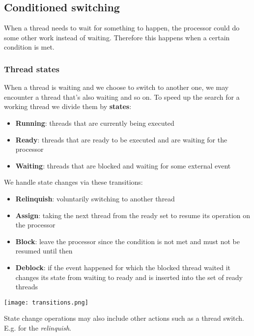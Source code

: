 \subsection{Conditioned switching}
When a thread needs to wait for something to happen, the processor could do some other work instead of waiting. Therefore this happens when a certain condition is met.

\subsubsection{Thread states}
When a thread is waiting and we choose to switch to another one, we may encounter a thread that's also waiting and so on. To speed up the search for a working thread we divide them by \textbf{states}:
\begin{itemize}
	\item \textbf{Running}: threads that are currently being executed
	\item \textbf{Ready}: threads that are ready to be executed and are waiting for the processor
	\item \textbf{Waiting}: threads that are blocked and waiting for some external event
\end{itemize}
We handle state changes via these transitions:
\begin{itemize}
	\item \textbf{Relinquish}: voluntarily switching to another thread
	\item \textbf{Assign}: taking the next thread from the ready set to resume its operation on the processor
	\item \textbf{Block}: leave the processor since the condition is not met and must not be resumed until then
	\item \textbf{Deblock}: if the event happened for which the blocked thread waited it changes its state from waiting to ready and is inserted into the set of ready threads
\end{itemize}
\begin{center}
	\texttt{[image: transitions.png]}
\end{center}

\begin{note}
	State change operations may also include other actions such as a thread switch. E.g. for the \textit{relinquish}.
\end{note}

